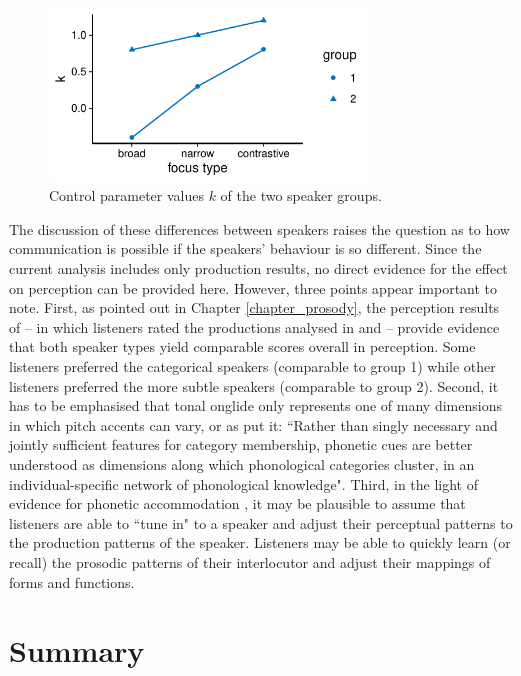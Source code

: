 \begin{figure}
\includegraphics[width=8.5cm]{figures/ch6/groups_k.pdf}
\caption{Control parameter values $k$ of the two speaker groups.}
\label{fig:groups_k}
\end{figure}

The discussion of these differences between speakers raises the question as to how communication is possible if the speakers' behaviour is so different. Since the current analysis includes only production results, no direct evidence for the effect on perception can be provided here. However, three points appear important to note. First, as pointed out in Chapter \ref{chapter_prosody}, the perception results of \citet{CangemiKrügerGrice2015} -- in which listeners rated the productions analysed in \citet{Griceetal2017} and \citet{MückeGrice2014} -- provide evidence that both speaker types yield comparable scores overall in perception. Some listeners preferred the categorical speakers (comparable to group 1) while other listeners preferred the more subtle speakers (comparable to group 2). Second, it has to be emphasised that tonal onglide only represents one of many dimensions in which pitch accents can vary, or as \citet[143]{CangemiKrügerGrice2015} put it: ``Rather than singly necessary and jointly sufficient features for category membership, phonetic cues are better understood as dimensions along which phonological categories cluster, in an individual-specific network of phonological knowledge". Third, in the light of evidence for phonetic accommodation \citep[e.g.][]{YuAbregoCollierSonderegger2013, Babel2009}, it may be plausible to assume that listeners are able to ``tune in" to a speaker and adjust their perceptual patterns to the production patterns of the speaker. Listeners may be able to quickly learn (or recall) the prosodic patterns of their interlocutor and adjust their mappings of forms and functions.

\section{Summary}

